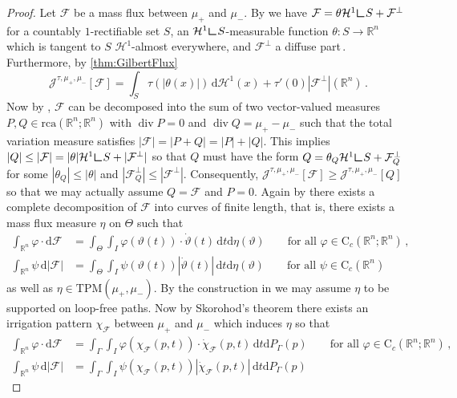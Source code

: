 \documentclass[10pt,a4paper,oneside,final]{article}
\newcommand{\R}{{\mathbb{R}}}
\newcommand{\de}{{\mathrm{d}}}
\DeclareMathOperator{\dv}{div}
\newcommand{\hdone}{\mathcal{H}^1}
\newcommand{\rca}{\mathrm{rca}}
\newcommand{\restr}{{\mbox{\LARGE$\llcorner$}}}
\newcommand{\cont}{{\mathrm{C}}}
\newcommand{\flux}{{\mathcal{F}}}
\newcommand{\reSpace}{\Gamma}
\newcommand{\reMeasure}{P_{\reSpace}}
\newcommand{\TPM}{\textrm{TPM}}
\newcommand{\JEn}{{\mathcal{J}}}
\newcommand{\transportPath}{mass flux}
\numberwithin{equation}{section}
\theoremstyle{plain}
\theoremstyle{definition}
\theoremstyle{remark}
\newcommand{\notinclude}[1]{}
\begin{document}
\begin{proof}
Let $\flux$ be a mass flux between $\mu_+$ and $\mu_-$. By \cite[Thm.\,4.2]{Sil08}
\notinclude{Let $\flux$ have finite cost. By \cref{thm:GilbertFlux}}%
we have $\flux=\theta\hdone\restr S+\flux^\perp$
for a countably $1$-rectifiable set $S$, an $\hdone\restr S$-measurable function $\theta:S\to\R^n$ which is tangent to $S$ $\hdone$-almost everywhere, and $\flux^\perp$ a diffuse part\,.
Furthermore, by \cref{thm:GilbertFlux}
\begin{equation*}
\JEn^{\tau,\mu_+,\mu_-}[\flux]
=\int_{S}\tau(|\theta(x)|)\,\de\hdone(x)+\tau'(0)|\flux^\perp|(\R^n)\,.
\end{equation*}
Now by \cite[Thm.\,C]{Sm93}, $\flux$ can be decomposed into the sum of two vector-valued measures $P,Q\in\rca(\R^n;\R^n)$ with $\dv P=0$ and $\dv Q=\mu_+-\mu_-$
such that the total variation measure satisfies $|\flux|=|P+Q|=|P|+|Q|$.
This implies $|Q|\leq|\flux|=|\theta|\hdone\restr S+|\flux^\perp|$
so that $Q$ must have the form $Q=\theta_Q\hdone\restr S+\flux_Q^\perp$ for some $|\theta_Q|\leq|\theta|$ and $|\flux_Q^\perp|\leq|\flux^\perp|$.
Consequently, $\JEn^{\tau,\mu_+,\mu_-}[\flux]\geq\JEn^{\tau,\mu_+,\mu_-}[Q]$ so that we may actually assume $Q=\flux$ and $P=0$.
Again by \cite[Thm.\,C]{Sm93} there exists a complete decomposition of $\flux$ into curves of finite length, that is, there exists a \transportPath{} measure $\eta$ on $\Theta$ such that
\begin{align*}
\int_{\R^n}\varphi\cdot\de\flux
&=\int_\Theta\int_I\varphi(\vartheta(t))\cdot\dot\vartheta(t)\,\de t\de\eta(\vartheta)
\qquad\text{for all }\varphi\in\cont_c(\R^n;\R^n)\,,\\
\int_{\R^n}\psi\,\de|\flux|
&=\int_\Theta\int_I\psi(\vartheta(t))|\dot\vartheta(t)|\,\de t\de\eta(\vartheta)
\qquad\text{for all }\psi\in\cont_c(\R^n)
\end{align*}
as well as $\eta\in\TPM(\mu_+,\mu_-)$.
By the construction in \cite{Sm93} we may assume $\eta$ to be supported on loop-free paths.
Now by Skorohod's theorem \cite[Thm.\,6.7]{Bil99} there exists an irrigation pattern $\chi_\flux$ between $\mu_+$ and $\mu_-$ which induces $\eta$ so that
\begin{align*}
\int_{\R^n}\varphi\cdot\de\flux
&=\int_\reSpace\int_I\varphi(\chi_\flux(p,t))\cdot\dot\chi_\flux(p,t)\,\de t\de\reMeasure(p)
\qquad\text{for all }\varphi\in\cont_c(\R^n;\R^n)\,,\\
\int_{\R^n}\psi\,\de|\flux|
&=\int_\reSpace\int_I\psi(\chi_\flux(p,t))|\dot\chi_\flux(p,t)|\,\de t\de\reMeasure(p)

\end{align*}
\end{proof}
\end{document}
